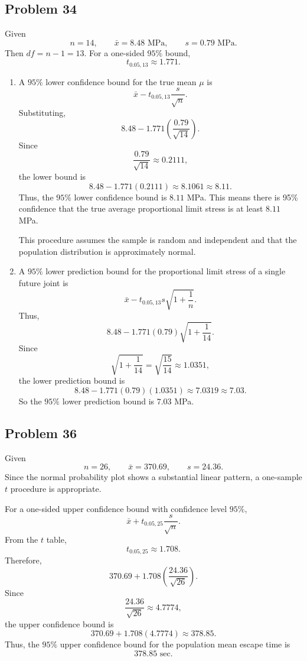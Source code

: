 \documentclass[11pt]{article}
\begin{document}
\subsection*{Problem 34}

Given
\[
n=14, \qquad \bar{x}=8.48\text{ MPa}, \qquad s=0.79\text{ MPa}.
\]
Then $df=n-1=13$. For a one-sided $95\%$ bound,
\[
t_{0.05,13}\approx 1.771.
\]

\begin{enumerate}
\item[(a)] A $95\%$ lower confidence bound for the true mean $\mu$ is
\[
\bar{x}-t_{0.05,13}\frac{s}{\sqrt{n}}.
\]
Substituting,
\[
8.48-1.771\left(\frac{0.79}{\sqrt{14}}\right).
\]
Since
\[
\frac{0.79}{\sqrt{14}}\approx 0.2111,
\]
the lower bound is
\[
8.48-1.771(0.2111)\approx 8.1061\approx 8.11.
\]
Thus, the $95\%$ lower confidence bound is $8.11$ MPa. This means there is 95\% confidence that the true average proportional limit stress is at least $8.11$ MPa.

This procedure assumes the sample is random and independent and that the population distribution is approximately normal.

\item[(b)] A $95\%$ lower prediction bound for the proportional limit stress of a single future joint is
\[
\bar{x}-t_{0.05,13}s\sqrt{1+\frac{1}{n}}.
\]
Thus,
\[
8.48-1.771(0.79)\sqrt{1+\frac{1}{14}}.
\]
Since
\[
\sqrt{1+\frac{1}{14}}=\sqrt{\frac{15}{14}}\approx 1.0351,
\]
the lower prediction bound is
\[
8.48-1.771(0.79)(1.0351)\approx 7.0319\approx 7.03.
\]
So the $95\%$ lower prediction bound is $7.03$ MPa.
\end{enumerate}

\subsection*{Problem 36}

Given
\[
n=26, \qquad \bar{x}=370.69, \qquad s=24.36.
\]
Since the normal probability plot shows a substantial linear pattern, a one-sample $t$ procedure is appropriate.

For a one-sided upper confidence bound with confidence level $95\%$,
\[
\bar{x}+t_{0.05,25}\frac{s}{\sqrt{n}}.
\]
From the $t$ table,
\[
t_{0.05,25}\approx 1.708.
\]
Therefore,
\[
370.69+1.708\left(\frac{24.36}{\sqrt{26}}\right).
\]
Since
\[
\frac{24.36}{\sqrt{26}}\approx 4.7774,
\]
the upper confidence bound is
\[
370.69+1.708(4.7774)\approx 378.85.
\]
Thus, the $95\%$ upper confidence bound for the population mean escape time is
\[
378.85\text{ sec}.
\]
\end{document}
